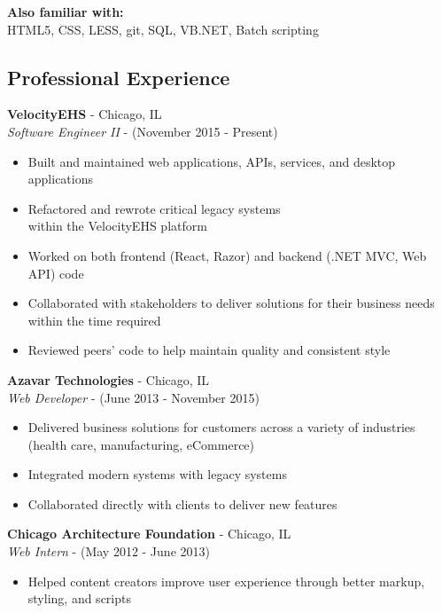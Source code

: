 \documentclass[12pt]{article}
\begin{document}
\begin{paracol}{2}
\noindent \textbf{Also familiar with:}\\
HTML5, CSS, LESS, git, SQL, VB.NET, Batch scripting

\switchcolumn 

\subsection*{Professional Experience} 

\textbf{VelocityEHS} - Chicago, IL \\
\textit{Software Engineer II} - {\footnotesize{(November 2015 - Present)}}
\begin{itemize}
    \item Built and maintained web applications, APIs, services, and desktop applications
    \item Refactored and rewrote critical legacy systems \\ within the VelocityEHS platform
    \item Worked on both frontend (React, Razor) and backend (.NET MVC, Web API) code 
    \item Collaborated with stakeholders to deliver solutions for their business needs within the time required
    \item Reviewed peers' code to help maintain quality and consistent style
\end{itemize} 

\noindent \textbf{Azavar Technologies} - Chicago, IL \\
\textit{Web Developer} - {\footnotesize(June 2013 - November 2015)}
\begin{itemize}
    \item Delivered business solutions for customers across a variety of industries (health care, manufacturing, eCommerce)
    \item Integrated modern systems with legacy systems
    \item Collaborated directly with clients to deliver new features
\end{itemize}

\noindent \textbf{Chicago Architecture Foundation} - Chicago, IL \\
\textit{Web Intern} - {\footnotesize{(May 2012 - June 2013)}}
\begin{itemize}
    \item Helped content creators improve user experience through better markup, styling, and scripts
\end{itemize}


\end{paracol}
\end{document}

